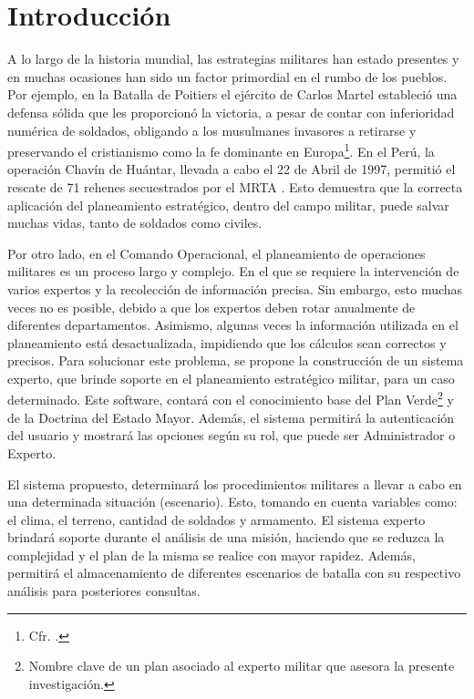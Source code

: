 \chapter{Introducción}

A lo largo de la historia mundial, las estrategias militares han estado presentes y en muchas ocasiones han sido un factor primordial en el rumbo de los pueblos. Por ejemplo, en la Batalla de Poitiers el ejército de Carlos Martel estableció una defensa sólida que les proporcionó la victoria, a pesar de contar con inferioridad numérica de soldados, obligando a los musulmanes invasores a retirarse y preservando el cristianismo como la fe dominante en Europa\footnote{Cfr. \citealt{Calliope21}.}. En el Perú, la operación Chavín de Huántar, llevada a cabo el 22 de Abril de 1997, permitió el rescate de 71 rehenes secuestrados por el MRTA
. Esto demuestra que la correcta aplicación del planeamiento estratégico, dentro del campo militar, puede salvar muchas vidas, tanto de soldados como civiles.

Por otro lado, en el Comando Operacional, el planeamiento de operaciones militares es un proceso largo y complejo. En el que se requiere la intervención de varios expertos y la recolección de información precisa. Sin embargo, esto muchas veces no es posible, debido a que los expertos deben rotar anualmente de diferentes departamentos. Asimismo, algunas veces la información utilizada en el planeamiento está desactualizada, impidiendo que los cálculos sean correctos y precisos.
Para solucionar este problema, se propone la construcción de un sistema experto, que brinde soporte en el planeamiento estratégico militar, para un caso determinado. Este software, contará con el conocimiento base del Plan Verde\footnote{Nombre clave de un plan asociado al experto militar que asesora la presente investigación.} y de la Doctrina del Estado Mayor. Además, el sistema permitirá la autenticación del usuario y mostrará las opciones según su rol, que puede ser Administrador o Experto.

El sistema propuesto, determinará los procedimientos militares a llevar a cabo en una determinada situación (escenario). Esto, tomando en cuenta variables como: el clima, el terreno, cantidad de soldados y armamento.
El sistema experto brindará soporte durante el análisis de una misión, haciendo que se reduzca la complejidad y el plan de la misma se realice con mayor rapidez. Además, permitirá el almacenamiento de diferentes escenarios de batalla con su respectivo análisis para posteriores consultas.
